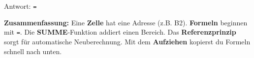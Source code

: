 \documentclass[11pt, a4paper]{article}
\newcommand{\luecke}[1]{\underline{\hspace{#1}}}
\begin{document}
\vspace{0.3em}
Antwort: \texttt{=}\luecke{2cm}

\vspace{0.5em}


\begin{merkkasten}
\textbf{Zusammenfassung:} Eine \textbf{Zelle} hat eine Adresse (z.B. B2). \textbf{Formeln} beginnen mit \texttt{=}. Die \textbf{SUMME}-Funktion addiert einen Bereich. Das \textbf{Referenzprinzip} sorgt für automatische Neuberechnung. Mit dem \textbf{Aufziehen} kopierst du Formeln schnell nach unten.
\end{merkkasten}
\end{document}
